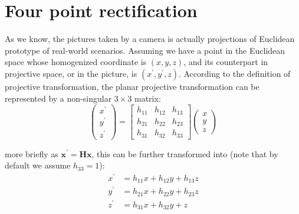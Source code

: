 \documentclass[conference]{IEEEtran}
\newcommand{\mat}[1]{\mathbf{#1}} %
\begin{document}





%
\IEEEpeerreviewmaketitle



\section{Four point rectification}
As we know, the pictures taken by a camera is actually projections of Euclidean prototype of real-world scenarios. Assuming we have a point in the Euclidean space whose homogenized coordinate is $(x, y, z)$, and its counterpart in projective space, or in the picture, is $(x^\prime , y^\prime , z)$. According to the definition of projective transformation, the planar projective transformation can be represented by a non-singular $3\times 3$ matrix:
\begin{equation}
	\begin{pmatrix}
		x^\prime \\
		y^\prime \\
		z^\prime 
	\end{pmatrix}
	=
	\begin{bmatrix}
		h_{11} & h_{12} & h_{13}\\
		h_{21} & h_{22} & h_{23}\\
		h_{31} &  h_{32} & h_{33}
	\end{bmatrix}
	\begin{pmatrix}
		x\\
		y\\
		z
	\end{pmatrix}
\end{equation}

\noindent more briefly as $\mat{x^\prime} = \mat{H} \mat{x}$, this can be further transformed into (note that by default we assume $h_{33} = 1$):
\begin{equation}
	\begin{split}
		x^\prime &= h_{11}x + h_{12}y + h_{13}z\\
		y^\prime &= h_{21}x + h_{22}y + h_{23}z\\
		z^\prime &= h_{31}x + h_{32}y + z
	\end{split}
\end{equation}
\end{document}
